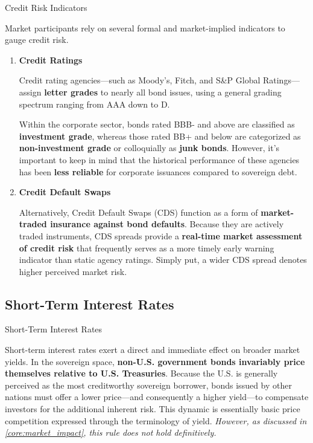 \documentclass[10pt]{article}
\begin{document}
    \begin{core}{Credit Risk Indicators}

      Market participants rely on several formal and market-implied indicators to gauge credit risk. 

      \begin{enumerate}

        \item \textbf{Credit Ratings} 

        Credit rating agencies---such as Moody's, Fitch, and S\&P Global Ratings---assign \textbf{letter grades} to nearly all bond issues, using a general grading spectrum ranging from AAA down to D. 

        Within the corporate sector, bonds rated BBB- and above are classified as \textbf{investment grade}, whereas those rated BB+ and below are categorized as \textbf{non-investment grade} or colloquially as \textbf{junk bonds}. However, it's important to keep in mind that the historical performance of these agencies has been \textbf{less reliable} for corporate issuances compared to sovereign debt.

        \item \textbf{Credit Default Swaps}

        Alternatively, Credit Default Swaps (CDS) function as a form of \textbf{market-traded insurance against bond defaults}. Because they are actively traded instruments, CDS spreads provide a \textbf{real-time market assessment of credit risk} that frequently serves as a more timely early warning indicator than static agency ratings. Simply put, a wider CDS spread denotes higher perceived market risk.

      \end{enumerate}

    \end{core}

  \subsection{Short-Term Interest Rates}

    \begin{core}{Short-Term Interest Rates}

      Short-term interest rates exert a direct and immediate effect on broader market yields. In the sovereign space, \textbf{non-U.S. government bonds invariably price themselves relative to U.S. Treasuries}. Because the U.S. is generally perceived as the most creditworthy sovereign borrower, bonds issued by other nations must offer a lower price---and consequently a higher yield---to compensate investors for the additional inherent risk. This dynamic is essentially basic price competition expressed through the terminology of yield. \textit{However, as discussed in \autoref{core:market_impact}, this rule does not hold definitively.}

    \end{core}
\end{document}
